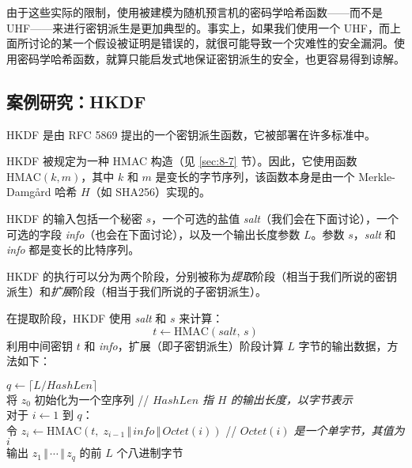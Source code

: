 由于这些实际的限制，使用被建模为随机预言机的密码学哈希函数——而不是 UHF——来进行密钥派生是更加典型的。事实上，如果我们使用一个 UHF，而上面所讨论的某一个假设被证明是错误的，就很可能导致一个灾难性的安全漏洞。使用密码学哈希函数，就算只能启发式地保证密钥派生的安全，也更容易得到谅解。
 
\subsection{案例研究：HKDF}\label{subsec:8-10-5}

HKDF 是由 RFC 5869 提出的一个密钥派生函数，它被部署在许多标准中。

HKDF 被规定为一种 HMAC 构造（见 \ref{sec:8-7} 节）。因此，它使用函数 $\mathrm{HMAC}(k,m)$，其中 $k$ 和 $m$ 是变长的字节序列，该函数本身是由一个 Merkle-Damg{\aa}rd 哈希 $H$（如 SHA256）实现的。

HKDF 的输入包括一个秘密 $s$，一个可选的盐值 \emph{salt}（我们会在下面讨论），一个可选的字段 \emph{info}（也会在下面讨论），以及一个输出长度参数 $L$。参数 $s$，\emph{salt} 和 \emph{info} 都是变长的比特序列。

HKDF 的执行可以分为两个阶段，分别被称为\emph{提取}阶段（相当于我们所说的密钥派生）和\emph{扩展}阶段（相当于我们所说的子密钥派生）。

在提取阶段，HKDF 使用 \emph{salt} 和 $s$ 来计算：
\[
t\leftarrow\mathrm{HMAC}(\textit{salt},\,s)
\]
利用中间密钥 $t$ 和 \emph{info}，扩展（即子密钥派生）阶段计算 $L$ 字节的输出数据，方法如下：

\vspace{5pt}

\hspace*{5pt} $q\leftarrow\lceil L/\mathit{HashLen}\rceil$\\
\hspace*{26pt} 将 $z_0$ 初始化为一个空序列
\quad // \quad \emph{$\mathit{HashLen}$ 指 $H$ 的输出长度，以字节表示}\\
\hspace*{26pt} 对于 $i\leftarrow 1$ 到 $q$：\\
\hspace*{50pt} 令 $z_i\leftarrow\mathrm{HMAC}(t,\;z_{i-1}\,\Vert\,\mathit{info}\,\Vert\,\mathit{Octet}(i))$
\quad // \quad \emph{$\mathit{Octet}(i)$ 是一个单字节，其值为 $i$}\\
\hspace*{26pt} 输出 $z_1\,\Vert\,\cdots\,\Vert\,z_q$ 的前 $L$ 个八进制字节

\vspace{5pt}

